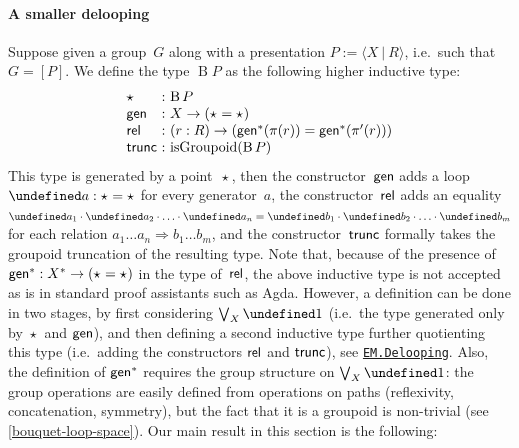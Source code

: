\documentclass[10pt,a4paper]{amsart}
\theoremstyle{definition}
\newcommand{\freegroup}[1]{#1^*} %
\newcommand{\pres}[2]{\langle #1\ |\ #2\rangle} %
\newcommand{\pgroup}[1]{[#1]} %
\let\S\undefined
\newcommand{\S}[1]{\operatorname{S}^{#1}} %
\newcommand{\B}{\operatorname{B}} %
\newcommand{\pt}[1]{\star_{#1}} %
\newcommand{\defd}{:=} %
\newcommand{\pcomp}{\cdot} %
\newcommand{\fst}{\pi}
\newcommand{\snd}{\pi'}
\newcommand{\isGroupoid}{\operatorname{isGroupoid}} %
\newcommand{\constructor}[1]{\operatorname{\textsf{\textup{#1}}}}
\newcommand{\ctrunc}{\constructor{trunc}}
\newcommand{\cgen}{\constructor{gen}}
\newcommand{\crel}{\constructor{rel}}
\let\ul\undefined
\newcommand{\ul}{\underline}
\newcommand{\To}{\Rightarrow}
\newcommand{\ie}{i.e.~}
\newcommand{\agda}[2]{\href{https://smimram.github.io/generated-deloopings-agda/#1.html\##2}{\texttt{#1.#2}}}
\begin{document}
\paragraph{A smaller delooping}
Suppose given a group~$G$ along with a presentation $P\defd\pres XR$, \ie such that $G=\pgroup P$. We define the type $\B P$ as the following higher inductive type:
\[
  \begin{array}{l@{\ :\ }l}
    \pt{}&{\B P}\\
    \cgen&X\to(\pt{}=\pt{})\\
    \crel&(r:R)\to(\freegroup\cgen(\fst(r))=\freegroup\cgen(\snd(r)))\\
    \ctrunc&\isGroupoid(\B P)
  \end{array}
\]
This type is generated by a point~$\pt{}$, then the constructor~$\cgen$ adds a
loop~$\ul a:\pt{}=\pt{}$ for every generator~$a$, the constructor~$\crel$ adds
an equality
$\ul a_1\pcomp\ul a_2\pcomp\ldots\pcomp\ul a_n=\ul b_1\pcomp\ul
b_2\pcomp\ldots\pcomp\ul b_m$ for each relation
$a_1\ldots a_n\To b_1\ldots b_m$, and the constructor~$\ctrunc$ formally takes
the groupoid truncation of the resulting type. Note that, because of the
presence of $\freegroup\cgen:\freegroup X\to(\pt{}=\pt{})$ in the type
of~$\crel$, the above inductive type is not accepted as is in standard proof
assistants such as Agda. However, a definition can be done in two stages, by
first considering $\bigvee_X\S1$ (\ie the type generated only by $\pt{}$ and $\cgen$), and then defining a
second inductive type further quotienting this type (\ie adding the
constructors $\crel$ and $\ctrunc$), see \agda{EM}{Delooping}. Also, the
definition of $\freegroup\cgen$ requires the group structure on $\bigvee_X\S1$: the group operations are easily defined from operations on paths (reflexivity, concatenation, symmetry), but the fact that it is a groupoid is non-trivial (see \cref{bouquet-loop-space}).
%
Our main result in this section is the following:
\end{document}
